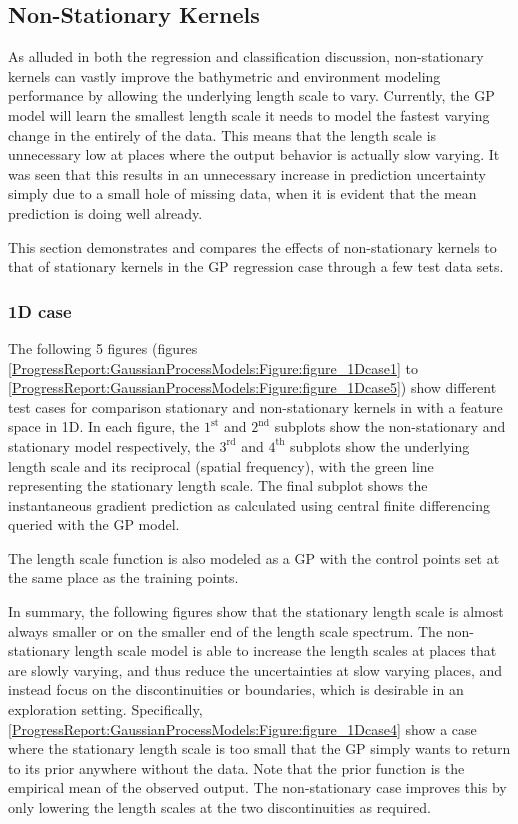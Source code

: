 		\subsection{Non-Stationary Kernels}
		\label{ProgressReport:GaussianProcessModels:NonStationaryKernels}
		
			As alluded in both the regression and classification discussion, non-stationary kernels can vastly improve the bathymetric and environment modeling performance by allowing the underlying length scale to vary. Currently, the GP model will learn the smallest length scale it needs to model the fastest varying change in the entirely of the data. This means that the length scale is unnecessary low at places where the output behavior is actually slow varying. It was seen that this results in an unnecessary increase in prediction uncertainty simply due to a small hole of missing data, when it is evident that the mean prediction is doing well already.
			
			This section demonstrates and compares the effects of non-stationary kernels to that of stationary kernels in the GP regression case through a few test data sets.
			
			\subsubsection{1D case}
				
				The following 5 figures (figures \ref{ProgressReport:GaussianProcessModels:Figure:figure_1Dcase1} to \ref{ProgressReport:GaussianProcessModels:Figure:figure_1Dcase5}) show different test cases for comparison stationary and non-stationary kernels in with a feature space in 1D. In each figure, the $1^{\mathrm{st}}$ and $2^{\mathrm{nd}}$ subplots show the non-stationary and stationary model respectively, the $3^{\mathrm{rd}}$ and $4^{\mathrm{th}}$ subplots show the underlying length scale and its reciprocal (spatial frequency), with the green line representing the stationary length scale. The final subplot shows the instantaneous gradient prediction as calculated using central finite differencing queried with the GP model.
				
				The length scale function is also modeled as a GP with the control points set at the same place as the training points.
				
				In summary, the following figures show that the stationary length scale is almost always smaller or on the smaller end of the length scale spectrum. The non-stationary length scale model is able to increase the length scales at places that are slowly varying, and thus reduce the uncertainties at slow varying places, and instead focus on the discontinuities or boundaries, which is desirable in an exploration setting. Specifically, \cref{ProgressReport:GaussianProcessModels:Figure:figure_1Dcase4} show a case where the stationary length scale is too small that the GP simply wants to return to its prior anywhere without the data. Note that the prior function is the empirical mean of the observed output. The non-stationary case improves this by only lowering the length scales at the two discontinuities as required.
				
